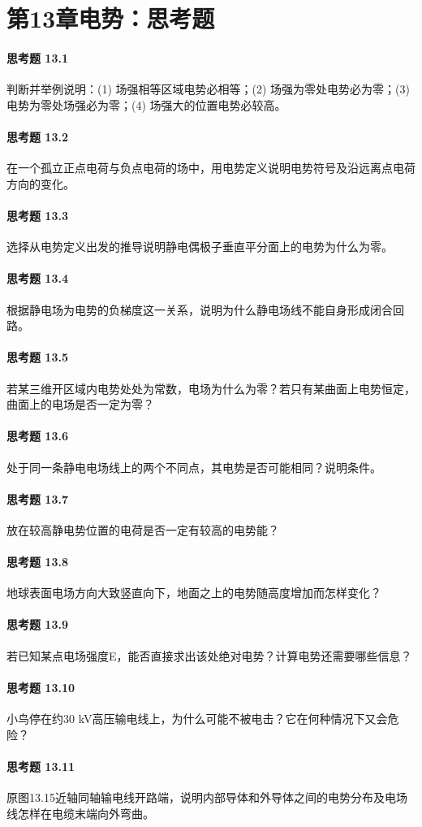 \section*{第13章\quad 电势：思考题}
\paragraph{思考题 13.1}
判断并举例说明：(1) 场强相等区域电势必相等；(2) 场强为零处电势必为零；(3) 电势为零处场强必为零；(4) 场强大的位置电势必较高。

\paragraph{思考题 13.2}
在一个孤立正点电荷与负点电荷的场中，用电势定义说明电势符号及沿远离点电荷方向的变化。

\paragraph{思考题 13.3}
选择从电势定义出发的推导说明静电偶极子垂直平分面上的电势为什么为零。

\paragraph{思考题 13.4}
根据静电场为电势的负梯度这一关系，说明为什么静电场线不能自身形成闭合回路。

\paragraph{思考题 13.5}
若某三维开区域内电势处处为常数，电场为什么为零？若只有某曲面上电势恒定，曲面上的电场是否一定为零？

\paragraph{思考题 13.6}
处于同一条静电电场线上的两个不同点，其电势是否可能相同？说明条件。

\paragraph{思考题 13.7}
放在较高静电势位置的电荷是否一定有较高的电势能？

\paragraph{思考题 13.8}
地球表面电场方向大致竖直向下，地面之上的电势随高度增加而怎样变化？

\paragraph{思考题 13.9}
若已知某点电场强度E，能否直接求出该处绝对电势？计算电势还需要哪些信息？

\paragraph{思考题 13.10}
小鸟停在约30 kV高压输电线上，为什么可能不被电击？它在何种情况下又会危险？

\paragraph{思考题 13.11}
原图13.15近轴同轴输电线开路端，说明内部导体和外导体之间的电势分布及电场线怎样在电缆末端向外弯曲。
